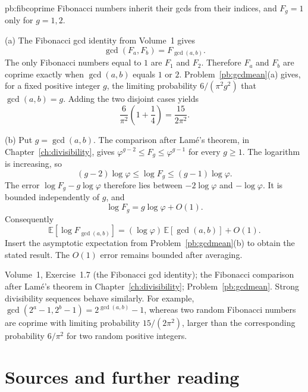 \begin{solution}{pb:fibcoprime}
\idea Fibonacci numbers inherit their gcds from their indices, and $F_g=1$ only for $g=1,2$.

\writeup (a) The Fibonacci gcd identity from Volume~1 gives
\[
\gcd(F_a,F_b)=F_{\gcd(a,b)}.
\]
The only Fibonacci numbers equal to $1$ are $F_1$ and $F_2$. Therefore $F_a$ and $F_b$ are coprime exactly when $\gcd(a,b)$ equals $1$ or $2$. Problem~\ref{pb:gcdmean}(a) gives, for a fixed positive integer $g$, the limiting probability $6/(\pi^2g^2)$ that $\gcd(a,b)=g$. Adding the two disjoint cases yields
\[
\frac6{\pi^2}\left(1+\frac14\right)
=\frac{15}{2\pi^2}.
\]

(b) Put $g=\gcd(a,b)$. The comparison after Lam\'e's theorem, in Chapter~\ref{ch:divisibility}, gives $\varphi^{g-2}\le F_g\le\varphi^{g-1}$ for every $g\ge1$. The logarithm is increasing, so
\[
(g-2)\log\varphi\le\log F_g\le(g-1)\log\varphi.
\]
The error $\log F_g-g\log\varphi$ therefore lies between $-2\log\varphi$ and $-\log\varphi$. It is bounded independently of $g$, and
\[
\log F_g=g\log\varphi+O(1).
\]
Consequently
\[
\mathbb E[\log F_{\gcd(a,b)}]
=(\log\varphi)\,\mathbb E[\gcd(a,b)]+O(1).
\]
Insert the asymptotic expectation from Problem~\ref{pb:gcdmean}(b) to obtain the stated result. The $O(1)$ error remains bounded after averaging.

\tools Volume~1, Exercise~1.7 (the Fibonacci gcd identity); the Fibonacci comparison after Lam\'e's theorem in Chapter~\ref{ch:divisibility}; Problem~\ref{pb:gcdmean}.
\leads Strong divisibility sequences behave similarly. For example, $\gcd(2^a-1,2^b-1)=2^{\gcd(a,b)}-1$, whereas two random Fibonacci numbers are coprime with limiting probability $15/(2\pi^2)$, larger than the corresponding probability $6/\pi^2$ for two random positive integers.
\end{solution}

\section*{Sources and further reading}

